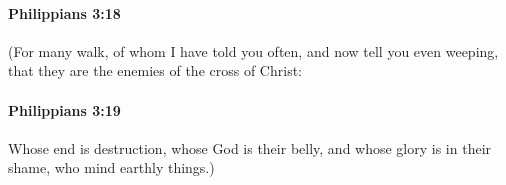 		\paragraph{Philippians 3:18} %
			\label{PHILIPPIANS-3-18}

			(For many walk, of whom I have told you often, and now tell you even weeping, that they are the enemies of the cross of Christ:

			\begin{framed}
			\scriptsize
				\begin{compactdesc}
					\item[SBLG] 
				\end{compactdesc}
			\end{framed}

		\paragraph{Philippians 3:19} %
			\label{PHILIPPIANS-3-19}

			Whose end is destruction, whose God is their belly, and whose glory is in their shame, who mind earthly things.)

